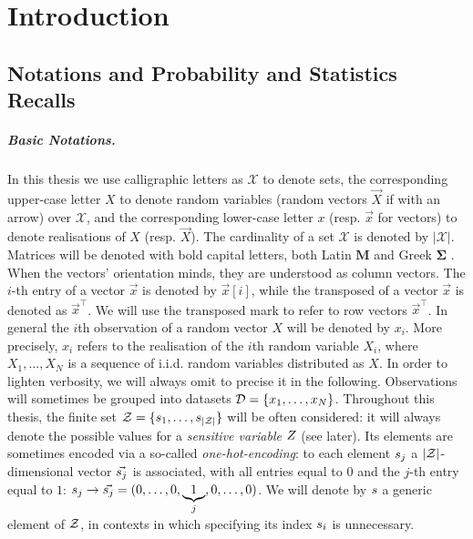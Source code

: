 \chapter{Introduction} %

\label{ChapterIntroductionSCA}

\section{Notations and Probability and Statistics Recalls}\label{sec:notations}
\paragraph*{Basic Notations.}
In this thesis we use calligraphic letters as $\mathcal{X}$ to denote
sets, the corresponding upper-case letter $X$ to denote random variables (random
vectors $\vec{X}$ if with an arrow) over $\mathcal{X}$, and the corresponding
lower-case letter $x$ (resp. $\vec{x}$ for vectors) to denote realisations of
$X$ (resp. $\vec{X}$). The cardinality of a set $\mathcal{X}$ is denoted by $\lvert\mathcal{X}\rvert$. Matrices will be denoted with bold capital letters, both Latin $\textbf{M}$ and Greek $\boldsymbol{\Sigma}$ . When the vectors' orientation minds, they are understood as column vectors. The
$i$-th entry of a vector $\vec{x}$ is denoted by $\vec{x}[i]$, while the transposed of a vector $\vec{x}$ is denoted as $\vec{x}^\intercal$. We will use the transposed mark to refer to row vectors $\vec{x}^\intercal$. In general the $i$th observation of a random vector $X$ will be denoted by $x_i$. More precisely, $x_i$ refers to the realisation of the $i$th random variable $X_i$, where $X_1, \dots , X_N$ is a sequence of i.i.d. random variables distributed as $X$. In order to lighten verbosity, we will always omit to precise it in the following. Observations will sometimes be grouped into datasets $\mathcal{D}=\{x_1,\dots, x_N\}$. Throughout this thesis, the finite set $\mathcal{Z} = \{s_{1}, \dots, s_{\lvert\mathcal{Z}\rvert}\}$ will be often considered: it will always denote the possible values for a \emph{sensitive variable} $Z$ (see later). Its elements are sometimes encoded via a so-called \emph{one-hot-encoding}: to each element $s_{j}$ a $\lvert\mathcal{Z}\rvert$-dimensional vector  $\vec{s_{j}}$ is associated,
with all entries equal to $0$ and the $j$-th entry equal to $1$: $s_{j}
\rightarrow \vec{s_{j}} = (0,\ldots , 0,\underbrace{1}_{j},0,\dots,0)$. We will denote by $s$ a generic element of $\mathcal{Z}$, in contexts in which specifying its index $s_{i}$ is unnecessary.

